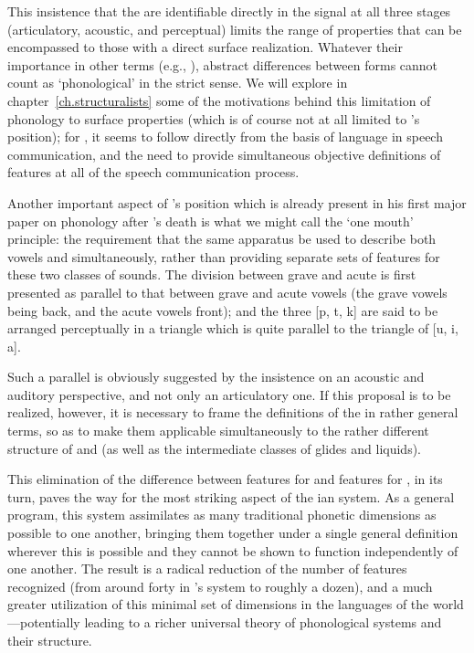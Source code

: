 This insistence that the  are identifiable
directly in the signal at all three stages (articulatory, acoustic,
and perceptual) limits the range of properties that can be encompassed
to those with a direct surface realization. Whatever their importance
in other terms (e.g., ), abstract differences between
forms cannot count as `phonological' in the strict sense. We will
explore in chapter~\ref{ch.structuralists} some of the motivations
behind this limitation of phonology to surface properties (which is of
course not at all limited to {\Jakobson}'s position); for {\Jakobson}, it
seems to follow directly from the basis of language in speech
communication, and the need to provide simultaneous objective
definitions of features at all  of the speech communication
process.

Another important aspect of {\Jakobson}'s position which is already
present in his first major paper on phonology after {\Trubetzkoy}'s death
is what we might call the `one mouth' principle: the requirement that
the same apparatus be used to describe both vowels and 
simultaneously, rather than providing separate sets of features for
these two classes of sounds. The division between grave and acute
 is first presented as parallel to that between grave and
acute vowels (the grave vowels being back, and the acute vowels
front); and the three  {[p, t, k]} are said to be arranged
perceptually in a triangle which is quite parallel to the 
triangle of {[u, i, a]}.

Such a parallel is obviously suggested by the insistence on an
acoustic and auditory perspective, and not only an articulatory
one. If this proposal is to be realized, however, it is necessary to
frame the definitions of the  in rather general
terms, so as to make them applicable simultaneously to the rather
different structure of  and  (as well as the
intermediate classes of glides and liquids).

This elimination of the difference between features for  and
features for , in its turn, paves the way for the most
striking aspect of the {\Jakobson}ian system. As a general program, this
system assimilates as many traditional phonetic dimensions as possible
to one another, bringing them together under a single general
definition wherever this is possible and they cannot be shown to
function independently of one another. The result is a radical
reduction of the number of features recognized (from around forty in
{\Trubetzkoy}'s system to roughly a dozen), and a much greater
utilization of this minimal set of dimensions in the languages of the
world—potentially leading to a richer universal theory of phonological
systems and their structure.

